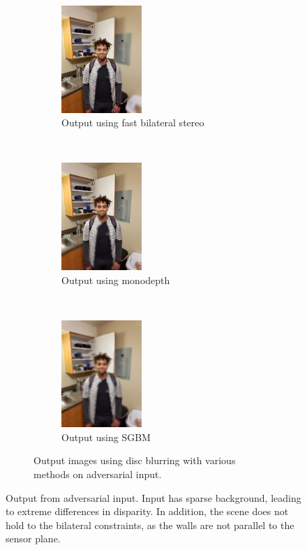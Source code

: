 \documentclass[10pt,twocolumn,letterpaper]{article}
\begin{document}
\begin{figure}[!t]
    \begin{subfigure}[t!]{\textwidth}
        \centering
        \begin{subfigure}[t]{0.33\textwidth}
            \centering
            \includegraphics[width=1.2in]{bin/output2_FBIL.jpg}
            \caption{Output using fast bilateral stereo}
        \end{subfigure}%
        ~
        \begin{subfigure}[t]{0.33\textwidth}
            \centering
            \includegraphics[width=1.2in]{bin/output2_monodepth.jpg}
            \caption{Output using monodepth}
        \end{subfigure}%
        ~
        \begin{subfigure}[t]{0.33\textwidth}
            \centering
            \includegraphics[width=1.2in]{bin/output2_SGBM.jpg}
            \caption{Output using SGBM}
        \end{subfigure}
        \caption*{Output images using disc blurring with various methods on adversarial input.}
    \end{subfigure}
    \caption{Output from adversarial input. Input has sparse background, leading to extreme differences in disparity. In addition, the scene does not hold to the bilateral constraints, as the walls are not parallel to the sensor plane.}
    \label{fig:output2}
\end{figure}
\end{document}
